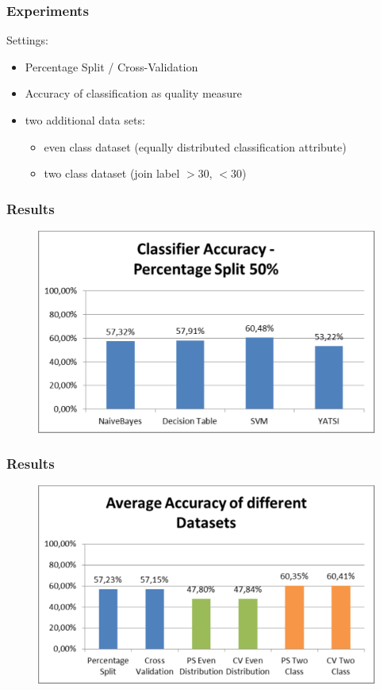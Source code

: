 \documentclass{beamer}
\begin{document}
\begin{frame}
\frametitle{Experiments}
Settings:
\begin{itemize}
 \item Percentage Split / Cross-Validation
 \item Accuracy of classification as quality measure
 \item two additional data sets:
 \begin{itemize}
 	\item even class dataset (equally distributed classification attribute)
 	\item two class dataset (join label $>30$, $<30$)
 \end{itemize}
\end{itemize}
\end{frame}

\begin{frame}
\frametitle{Results}
	\begin{figure}
		\center
		\includegraphics[width=.8\textwidth]{./img/Accuracy_PS50.pdf}
	\end{figure}
\end{frame}
\begin{frame}
	\frametitle{Results}
	\begin{figure}
		\center
		\includegraphics[width=.8\textwidth]{./img/avgAccuracy.pdf}
	\end{figure}
\end{frame}
\end{document}
